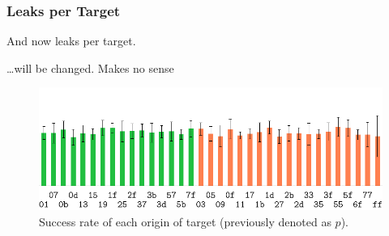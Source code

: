
\subsubsection{Leaks per Target}
	
	And now leaks per target. %
	
	\ldots will be changed. Makes no sense
	
	\begin{figure}[h]
	\begin{center}
		\includegraphics{figures/leak_target/leak_target.pdf}
		\caption{Success rate of each origin of target (previously denoted as $p$).}
		\label{fig:leaktargethist}
	\end{center}
	\end{figure}

